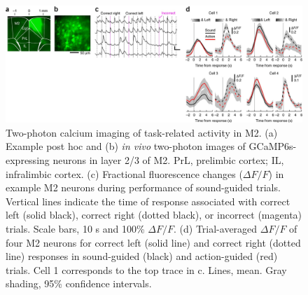\begin{figure}[htbp]

\begin{center}
\includegraphics[width=\textwidth]{Figures/Chapter3/NN_fig3} 
\end{center}

\caption[Two-photon Ca$^{2+}$ imaging of task-related activity in M2]
{
Two-photon calcium imaging of task-related activity in M2.
(a) Example post hoc and (b) \emph{in vivo} two-photon images of GCaMP6s-expressing neurons in layer 2/3 of M2. PrL, prelimbic cortex; IL, infralimbic cortex. (c) Fractional fluorescence changes ($\Delta F/F$) in example M2 neurons during performance of sound-guided trials. Vertical lines indicate the time of response associated with correct left (solid black), correct right (dotted black), or incorrect (magenta) trials. Scale bars, 10 s and 100\% $\Delta F/F$. (d) Trial-averaged $\Delta F/F$ of four M2 neurons for correct left (solid line) and correct right (dotted line) responses in sound-guided (black) and action-guided (red) trials. Cell 1 corresponds to the top trace in c. Lines, mean. Gray shading, 95\% confidence intervals.
}


\label{fig:NN_fig3}
\end{figure}